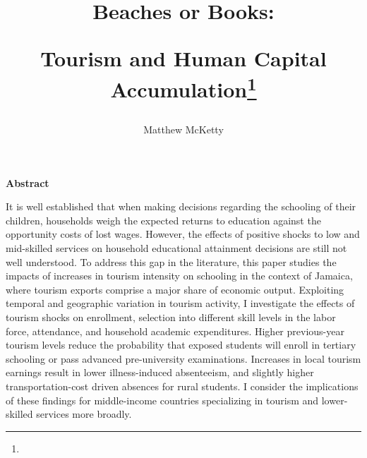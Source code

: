 \documentclass[12pt]{article}
\title{\textbf{Beaches or Books:}\\
	\centerline{\textbf{Tourism and Human Capital Accumulation}\thanks{
		 }}}
\author{Matthew McKetty}
\affil{University of Wisconsin -- Madison}
\date{}
\begin{document}
	\maketitle

\ifdefined\DissertationBuild\else
	\vspace{-2em}
	\begin{center}
		{\large\textbf{Abstract}\par}
		\vspace{0.5em}
		\begin{minipage}{0.85\textwidth}
			\small
			\setlength{\parskip}{0.5em}
			\linespread{1.0}\selectfont
			\setlength{\parindent}{2em}
        It is well established that when making decisions regarding the schooling of their children, households weigh the expected returns to education against the opportunity costs of lost wages. However, the effects of positive shocks to low and mid-skilled services on household educational attainment decisions are still not well understood. To address this gap in the literature, this paper studies the impacts of increases in tourism intensity on schooling in the context of Jamaica, where tourism exports comprise a major share of economic output. Exploiting temporal and geographic variation in tourism activity, I investigate the effects of tourism shocks on enrollment, selection into different skill levels in the labor force, attendance, and household academic expenditures. Higher previous-year tourism levels reduce the probability that exposed students will enroll in tertiary schooling or pass advanced pre-university examinations. Increases in local tourism earnings result in lower illness-induced absenteeism, and slightly higher transportation-cost driven absences for rural students. I consider the implications of these findings for middle-income countries specializing in tourism and lower-skilled services more broadly.
		\end{minipage}
	\end{center}
\end{document}
